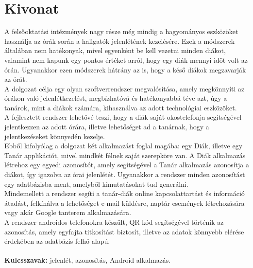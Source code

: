 \documentclass[12pt]{article}
\numberwithin{figure}{section}
\numberwithin{equation}{section}
\begin{document}
	


\newpage



\newpage



\newpage



\newpage



\newpage



\newpage

\thispagestyle{empty}
\section*{Kivonat}

A felsőoktatási intézmények nagy része még mindig a hagyományos eszközöket használja az órák során a hallgatók jelenlétének kezelésére. Ezek a módszerek általában nem hatékonyak, mivel egyenként be kell vezetni minden diákot, valamint nem kapunk egy pontos értéket arról, hogy egy diák mennyi időt volt az órán. Ugyanakkor ezen módszerek hátrány az is, hogy a késő diákok megzavarják az órát. \\
A dolgozat célja egy olyan szoftverrendszer megvalósítása, amely megkönnyíti az órákon való jelenlétkezelést, megbízhatóvá és hatékonyabbá téve azt, úgy a tanárok, mint a diákok számára, kihasználva az adott technológiai eszközöket.\\
A fejlesztett rendszer lehetővé teszi, hogy a diák saját okostelefonja segítségével jelentkezzen az adott órára, illetve lehetőséget ad a tanárnak, hogy a jelentkezéseket könnyedén kezelje. \\
Ebből kifolyólag a dolgozat két alkalmazást foglal magába: egy Diák, illetve egy Tanár applikációt, mivel mindkét félnek saját szerepköre van. A Diák alkalmazás létrehoz egy egyedi azonosítót, amely segítségével a Tanár alkalmazás azonosítja a diákot, így igazolva az órai jelenlétét. Ugyanakkor a rendszer minden azonosítást egy adatbázisba ment, amelyből kimutatásokat tud generálni.\\
Mindemellett a rendszer segíti a tanár-diák online kapcsolattartást és információ átadást, felkínálva a lehetőséget e-mail küldésre, naptár események létrehozására vagy akár Google tanterem alkalmazására.\\
A rendszer androidos telefonokra készült, QR kód segítségével történik az azonosítás, amely egyfajta titkosítást biztosít, illetve az adatok könnyebb elérése érdekében az adatbázis felhő alapú. \\
\\
\textbf{Kulcsszavak:} jelenlét, azonosítás, Android alkalmazás.
\end{document}
